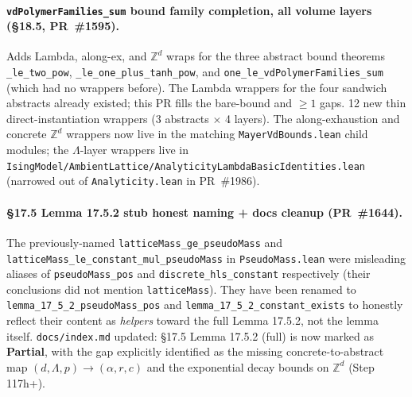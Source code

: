 \documentclass[a4paper,11pt]{article}
\begin{document}
\paragraph{\texttt{vdPolymerFamilies\_sum} bound family completion,
all volume layers (\S18.5, PR~\#1595).} Adds Lambda, along-ex, and
$\mathbb{Z}^d$ wraps for the three abstract bound theorems
\texttt{\_le\_two\_pow},
\texttt{\_le\_one\_plus\_tanh\_pow}, and
\texttt{one\_le\_vdPolymerFamilies\_sum} (which had no wrappers
before). The Lambda wrappers for the four sandwich abstracts already
existed; this PR fills the bare-bound and \(\geq 1\) gaps. 12 new
thin direct-instantiation wrappers (3 abstracts $\times$ 4
layers). The along-exhaustion and concrete $\mathbb{Z}^d$ wrappers
now live in the matching \texttt{MayerVdBounds.lean} child modules;
the $\Lambda$-layer wrappers live in
\texttt{IsingModel/AmbientLattice/AnalyticityLambdaBasicIdentities.lean}
(narrowed out of \texttt{Analyticity.lean} in PR~\#1986).

\paragraph{\S17.5 Lemma 17.5.2 stub honest naming + docs cleanup
(PR~\#1644).} The previously-named
\texttt{latticeMass\_ge\_pseudoMass} and
\texttt{latticeMass\_le\_constant\_mul\_pseudoMass} in
\texttt{PseudoMass.lean} were misleading aliases of
\texttt{pseudoMass\_pos} and \texttt{discrete\_hls\_constant}
respectively (their conclusions did not mention
\texttt{latticeMass}). They have been renamed to
\texttt{lemma\_17\_5\_2\_pseudoMass\_pos} and
\texttt{lemma\_17\_5\_2\_constant\_exists} to honestly reflect
their content as \emph{helpers} toward the full Lemma 17.5.2,
not the lemma itself. \texttt{docs/index.md} updated: §17.5
Lemma 17.5.2 (full) is now marked as \textbf{Partial}, with the
gap explicitly identified as the missing concrete-to-abstract map
$(d, \Lambda, p) \to (\alpha, r, c)$ and the exponential decay
bounds on $\mathbb{Z}^d$ (Step 117h+).
\end{document}
